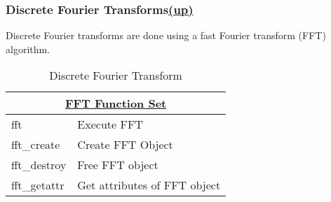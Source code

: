 \subsubsection*{Discrete Fourier Transforms\hspace*{\fill}\hyperlink{SignalProcessing}{(up)}\hypertarget{fftFunctions}{}} 
Discrete Fourier transforms are done using a fast Fourier transform (FFT) algorithm. 
\begin{table}[H]
\caption{Discrete Fourier Transform}
\label{tab:fftFunctions}
\begin{center}
\begin{tabular}{|l|l|}
\multicolumn{2}{c}{\hyperlink{fftFunc}{\rmfamily \bfseries FFT Function Set}} \\ \hline
fft & Execute FFT\\
fft\_create & Create FFT Object\\
fft\_destroy & Free FFT object\\
fft\_getattr & Get attributes of FFT object\\
\hline\end{tabular}
\end{center}
\end{table}%